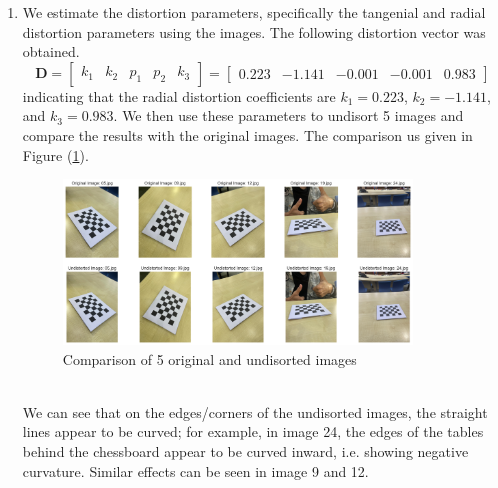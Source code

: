 \documentclass[10pt]{article}
\newcommand{\figref}[1]{Figure (\ref{fig:#1})}
\begin{document}
\begin{enumerate}
        \item We estimate the distortion parameters, specifically the tangenial and
        radial distortion parameters using the images. The following distortion vector
        was obtained.
        \begin{equation*}
            \mathbf{D} = \begin{bmatrix}
                k_{1} & k_{2} & p_{1} & p_{2} & k_{3}
            \end{bmatrix} = \begin{bmatrix}
                0.223 & -1.141 & -0.001 & -0.001 & 0.983
            \end{bmatrix}
        \end{equation*}
        indicating that the radial distortion coefficients are $k_{1} = 0.223$,
        $k_{2} = -1.141$, and $k_{3} = 0.983$. We then use these parameters to undisort
        5 images and compare the results with the original images. The comparison us given
        in \figref{distortions}.
        \begin{figure}[htbp]
            \begin{center}
                \includegraphics[width=0.875\textwidth]{Assets/Question-4/distortions.png}
                \caption{Comparison of 5 original and undisorted images}
                \label{fig:distortions}
            \end{center}
        \end{figure}
        \vspace*{0pt} \\
        We can see that on the edges/corners of the undisorted images, the straight lines
        appear to be curved; for example, in image 24, the edges of the tables behind the
        chessboard appear to be curved inward, i.e. showing negative curvature. Similar
        effects can be seen in image 9 and 12.


\end{enumerate}
\end{document}
